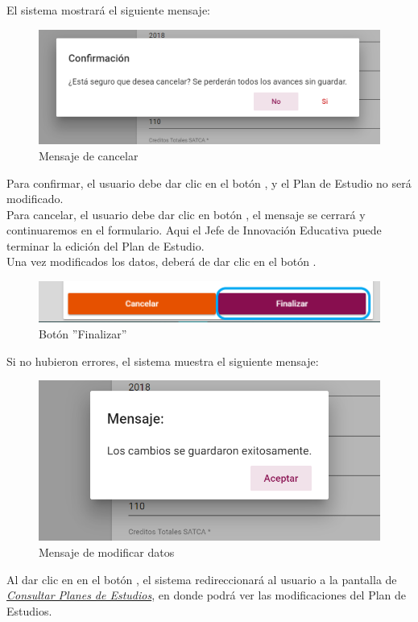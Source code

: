El sistema mostrará el siguiente mensaje:
\begin{figure}[!hbtp]
	\centering
	\hypertarget{ms1}{\includegraphics[width=0.7\linewidth]{images/SP4-GPE/m1}}
	\caption{Mensaje de cancelar}
	\label{ms1}
\end{figure}

Para confirmar, el usuario debe dar clic en el botón  , y el Plan de Estudio no será modificado.\\

Para cancelar, el usuario debe dar clic en botón  , el mensaje se cerrará y continuaremos en el formulario. Aqui el Jefe de Innovación Educativa puede terminar la edición del Plan de Estudio.\\

Una vez modificados los datos, deberá de dar clic en el botón  .
\begin{figure}[!hbtp]
	\centering
	\hypertarget{btnfin}{\includegraphics[width=0.7\linewidth]{images/SP4-GPE/editarPER}}
	\caption{Botón ''Finalizar''}
	\label{btnfin}
\end{figure}

Si no hubieron errores, el sistema muestra el siguiente mensaje:
\begin{figure}[!hbtp]
	\centering
	\hypertarget{ms2}{\includegraphics[width=0.7\linewidth]{images/SP4-GPE/m2}}
	\caption{Mensaje de modificar datos}
	\label{ms2}
\end{figure}


Al dar clic en en el botón  , el sistema redireccionará al usuario a la pantalla de \hyperlink{consultarPE}{\textit{Consultar Planes de Estudios}}, en donde podrá ver las modificaciones del Plan de Estudios.\\
\newpage
